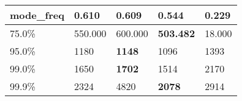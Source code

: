 \begin{table}[H]
\begin{tabular}{|l|m{10em}|m{10em}|m{10em}|m{10em}|}
\hline mode\_freq & 0.610 & \bfseries 0.609 & 0.544 & \cellcolor[rgb]{0.9, 0.54, 0.52} 0.229 \\
\hline 75.0\% & 550.000 & 600.000 & \bfseries 503.482 & \cellcolor[rgb]{0.9, 0.54, 0.52} 18.000 \\
\hline 95.0\% & 1180 & \bfseries 1148 & 1096 & \cellcolor[rgb]{0.9, 0.54, 0.52} 1393 \\
\hline 99.0\% & 1650 & \bfseries 1702 & 1514 & \cellcolor[rgb]{0.9, 0.54, 0.52} 2170 \\
\hline 99.9\% & 2324 & \cellcolor[rgb]{0.9, 0.54, 0.52} 4820 & \bfseries 2078 & 2914 \\
\hline
\end{tabular}
\end{table}
